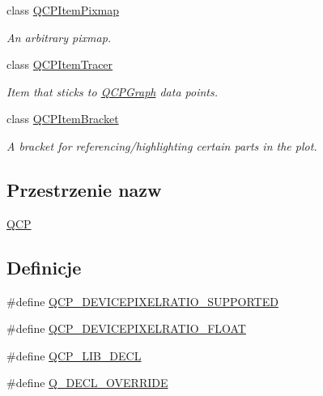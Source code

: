 \begin{DoxyCompactItemize}
class \hyperlink{class_q_c_p_item_pixmap}{Q\+C\+P\+Item\+Pixmap}
\begin{DoxyCompactList}\small\item\em An arbitrary pixmap. \end{DoxyCompactList}\item 
class \hyperlink{class_q_c_p_item_tracer}{Q\+C\+P\+Item\+Tracer}
\begin{DoxyCompactList}\small\item\em Item that sticks to \hyperlink{class_q_c_p_graph}{Q\+C\+P\+Graph} data points. \end{DoxyCompactList}\item 
class \hyperlink{class_q_c_p_item_bracket}{Q\+C\+P\+Item\+Bracket}
\begin{DoxyCompactList}\small\item\em A bracket for referencing/highlighting certain parts in the plot. \end{DoxyCompactList}\end{DoxyCompactItemize}
\subsection*{Przestrzenie nazw}
\begin{DoxyCompactItemize}
\item 
 \hyperlink{namespace_q_c_p}{Q\+CP}
\end{DoxyCompactItemize}
\subsection*{Definicje}
\begin{DoxyCompactItemize}
\item 
\#define \hyperlink{qcustomplot_8hh_aa441208467c396e9be040369952f0107}{Q\+C\+P\+\_\+\+D\+E\+V\+I\+C\+E\+P\+I\+X\+E\+L\+R\+A\+T\+I\+O\+\_\+\+S\+U\+P\+P\+O\+R\+T\+ED}
\item 
\#define \hyperlink{qcustomplot_8hh_a6ac48bd184a7a8b315c504bac7d7318c}{Q\+C\+P\+\_\+\+D\+E\+V\+I\+C\+E\+P\+I\+X\+E\+L\+R\+A\+T\+I\+O\+\_\+\+F\+L\+O\+AT}
\item 
\#define \hyperlink{qcustomplot_8hh_a5eaab02224a642ded7fb8951e973a02c}{Q\+C\+P\+\_\+\+L\+I\+B\+\_\+\+D\+E\+CL}
\item 
\#define \hyperlink{qcustomplot_8hh_a42cc5eaeb25b85f8b52d2a4b94c56f55}{Q\+\_\+\+D\+E\+C\+L\+\_\+\+O\+V\+E\+R\+R\+I\+DE}
\end{DoxyCompactItemize}
